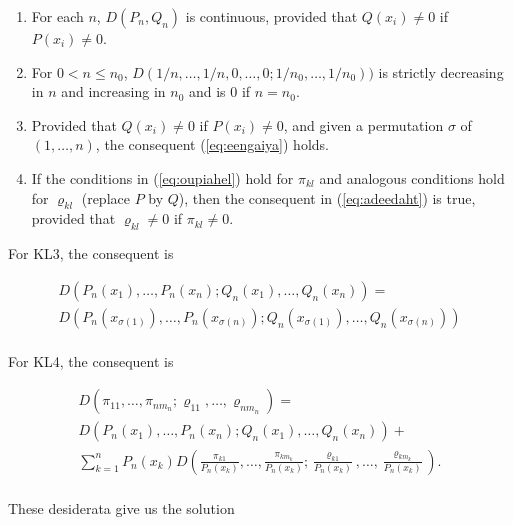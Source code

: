 \documentclass[phd,12pt,oneside]{ubcthesis}
\begin{document}
\begin{enumerate}[(KL1)]
\item For each $n$, $D(P_{n},Q_{n})$ is continuous, provided that
  $Q(x_{i})\neq{}0$ if $P(x_{i})\neq{}0$.
\item For $0<n\leq{}n_{0}$,
  $D(1/n,\ldots,1/n,0,\ldots,0;1/n_{0},\ldots,1/n_{0}))$ is strictly
  decreasing in $n$ and increasing in $n_{0}$ and is $0$ if $n=n_{0}$.
\item Provided that $Q(x_{i})\neq{}0$ if $P(x_{i})\neq{}0$, and given
  a permutation $\sigma$ of $(1,\ldots,n)$, the consequent
  (\ref{eq:eengaiya}) holds.
\item If the conditions in (\ref{eq:oupiahel}) hold for $\pi_{kl}$ and
  analogous conditions hold for $\varrho_{kl}$ (replace $P$ by $Q$),
  then the consequent in (\ref{eq:adeedaht}) is true, provided that
  $\varrho_{kl}\neq{}0$ if $\pi_{kl}\neq{}0$.
\end{enumerate}

{\noindent}For KL3, the consequent is

\begin{equation}
  \label{eq:eengaiya}
  \begin{array}{l}
    \displaystyle
    D(P_{n}(x_{1}),\ldots,P_{n}(x_{n});Q_{n}(x_{1}),\ldots,Q_{n}(x_{n}))= \\
    D(P_{n}(x_{\sigma(1)}),\ldots,P_{n}(x_{\sigma(n)});Q_{n}(x_{\sigma(1)}),\ldots,Q_{n}(x_{\sigma(n)})) \\
  \end{array}
\end{equation}

{\noindent}For KL4, the consequent is

\begin{equation}
  \label{eq:adeedaht}
  \begin{array}{l}
    \displaystyle D(\pi_{11},\ldots,\pi_{nm_{n}};\varrho_{11},\ldots,\varrho_{nm_{n}})= \\
    \displaystyle D(P_{n}(x_{1}),\ldots,P_{n}(x_{n});Q_{n}(x_{1}),\ldots,Q_{n}(x_{n}))+ \\
    \displaystyle \sum_{k=1}^{n}P_{n}(x_{k})D\left(\frac{\pi_{k1}}{P_{n}(x_{k})},\ldots,\frac{\pi_{km_{k}}}{P_{n}(x_{k})};\frac{\varrho_{k1}}{P_{n}(x_{k})},\ldots,\frac{\varrho_{km_{k}}}{P_{n}(x_{k})}\right). \\
  \end{array}
\end{equation}

{\noindent}These desiderata give us the solution
\end{document}
